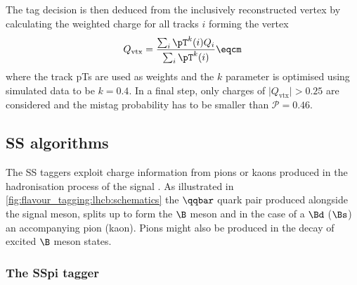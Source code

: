 The tag decision is then deduced from the inclusively reconstructed vertex by
calculating the weighted charge for all tracks $i$ forming the vertex
%
\begin{equation}\label{eq:flavour_tagging:os:vertex:charge}
  Q_\text{vtx} = \frac{\sum_i \pT^k(i)Q_i}{\sum_i\pT^k(i)}\eqcm
\end{equation}
where the track \acp{pT} are used as weights and the $k$ parameter is optimised
using simulated data to be $k=\num{0.4}$. In a final step, only charges of
$\vert Q_\text{vtx} \vert > 0.25$ are considered and the mistag probability has
to be smaller than $\mathcal{P}=0.46$.

\subsection{\Acl{SS} algorithms}
\label{sec:flavour_tagging:ss}

The \acl{SS} taggers exploit charge information from pions or kaons produced in
the hadronisation process of the signal \Bmeson. As illustrated in
\cref{fig:flavour_tagging:lhcb:schematics} the $\qqbar$ quark pair produced
alongside the signal meson, splits up to form the $\B$ meson and in the case of
a $\Bd$ ($\Bs$) an accompanying pion (kaon). Pions might also be produced in the
decay of excited $\B$ meson states.

\subsubsection{The \acl{SSpi} tagger}
\label{sec:flavour_tagging:ss:pion}

